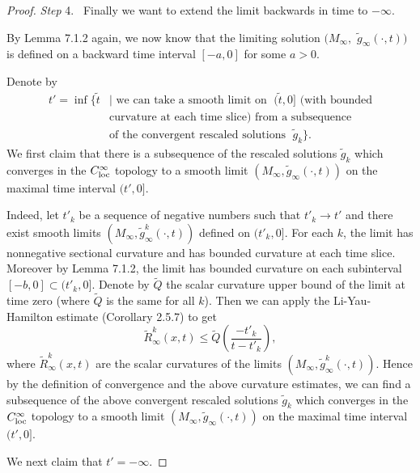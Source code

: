 \begin{proof}
\medskip
{\it Step} 4. \  Finally we want to extend the limit backwards in
time to $-\infty$.

By Lemma 7.1.2 again, we now know that the limiting solution
$(M_{\infty},$ $\tilde{g}_{\infty}(\cdot,t))$ is defined on a
backward time interval $[-a,0]$ for some $a>0$.

Denote by
\begin{align*}
t' = \inf \{ \tilde{t}&  | \mbox{ we can take a
smooth limit on }\; (\tilde{t},0]  \mbox { (with bounded} \\
& \mbox {curvature at each time slice) from a subsequence}\\
&  \mbox {of the convergent rescaled solutions }\; \tilde{g}_k\}.
\end{align*}
We first claim that there is a subsequence of the rescaled
solutions $\tilde{g}_k$ which converges in the $C^{\infty}_{\rm
loc}$ topology to a smooth limit
$(M_{\infty},\tilde{g}_{\infty}(\cdot,t))$ on the maximal time
interval $(t',0]$.

Indeed, let $t'_k$ be a sequence of negative numbers such that
$t'_k\rightarrow t'$ and there exist smooth limits
$(M_{\infty},\tilde{g}_{\infty}^{k}(\cdot,t))$ defined on
$(t'_k,0]$. For each $k$, the limit has nonnegative sectional
curvature and has bounded curvature at each time slice. Moreover
by Lemma 7.1.2, the limit has bounded curvature on each
subinterval $[-b,0]\subset(t'_k,0]$. Denote by $\tilde{Q}$ the
scalar curvature upper bound of the limit at time zero (where
$\tilde{Q}$ is the same for all $k$). Then we can apply the
Li-Yau-Hamilton estimate (Corollary 2.5.7) to get
$$
\tilde{R}_{\infty}^{k}(x,t)\leq\tilde{Q} \left(\frac{-t'_k}{t-t'_k}\right),
$$
where $\tilde{R}_{\infty}^{k}(x,t)$ are the scalar curvatures of
the limits $(M_{\infty},\tilde{g}_{\infty}^{k}(\cdot,t))$.  Hence
by the definition of convergence and the above curvature
estimates, we can find a subsequence of the above convergent
rescaled solutions $\tilde{g}_k$ which converges in the
$C^{\infty}_{\rm loc}$ topology to a smooth limit
$(M_{\infty},\tilde{g}_{\infty}(\cdot,t))$ on the maximal time
interval $(t',0]$.

We next claim that $t'=-\infty$.


\end{proof}
